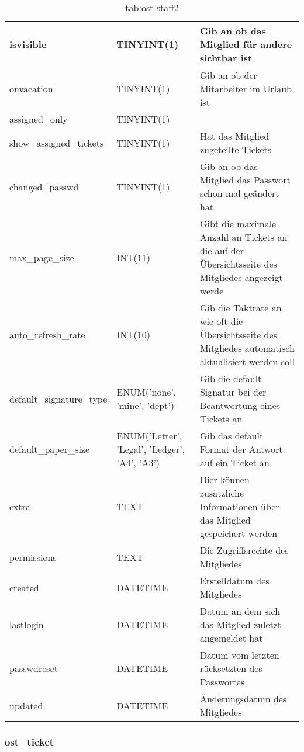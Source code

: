 		\label{tab:ost_staff}
		\newpage
		\begin{table}[h]
			\begin{tabular}{|p{3.5cm}|p{4cm}|p{6.2cm}|}
		\hline
		isvisible & TINYINT(1) & Gib an ob das Mitglied für andere sichtbar ist \\
		\hline
		onvacation & TINYINT(1) & Gib an ob der Mitarbeiter im Urlaub ist \\
		\hline
		assigned\_only & TINYINT(1) & \\
		\hline
		show\_assigned\_tickets & TINYINT(1) & Hat das Mitglied zugeteilte Tickets \\
		\hline
		changed\_passwd & TINYINT(1) & Gib an ob das Mitglied das Passwort schon mal geändert hat\\
		\hline
		max\_page\_size & INT(11) & Gibt die maximale Anzahl an Tickets an die auf der Übersichtsseite des Mitgliedes angezeigt werde \\
		\hline
		auto\_refresh\_rate & INT(10) & Gib die Taktrate an wie oft die Übersichtsseite des Mitgliedes automatisch aktualisiert werden soll \\
		\hline
		default\_signature\_type & ENUM('none', 'mine', 'dept') & Gib die default Signatur bei der Beantwortung eines Tickets an \\
		\hline
		default\_paper\_size & ENUM('Letter', 'Legal', 'Ledger', 'A4', 'A3') & Gib das default Format der Antwort auf ein Ticket an \\
		\hline
		extra & TEXT & Hier können zusätzliche Informationen über das Mitglied gespeichert werden \\
		\hline
		permissions & TEXT & Die Zugriffsrechte des Mitgliedes \\
		\hline
		created & DATETIME & Erstelldatum des Mitgliedes \\
		\hline
		lastlogin & DATETIME & Datum an dem sich das Mitglied zuletzt angemeldet hat \\
		\hline
		passwdreset & DATETIME & Datum vom letzten rücksetzten des Passwortes \\
		\hline
		updated & DATETIME & Änderungsdatum des Mitgliedes \\
		\hline
	\end{tabular}
	\caption{tab:ost-staff2}
\end{table}
\label{tab:ost_staff2}

\newpage

\subsubsection{ost\_ticket}

